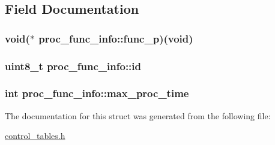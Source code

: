 \subsection{\-Field \-Documentation}
\hypertarget{structproc__func__info_ab0d228e3d6f56666fb9d9bf0f25f8d7b}{
\subsubsection[{func\-\_\-p}]{\setlength{\rightskip}{0pt plus 5cm}void($\ast$ {\bf proc\-\_\-func\-\_\-info\-::func\-\_\-p})(void)}}
\label{structproc__func__info_ab0d228e3d6f56666fb9d9bf0f25f8d7b}
\hypertarget{structproc__func__info_a133713acbe60983f171f71e2d81fae3f}{
\subsubsection[{id}]{\setlength{\rightskip}{0pt plus 5cm}uint8\-\_\-t {\bf proc\-\_\-func\-\_\-info\-::id}}}
\label{structproc__func__info_a133713acbe60983f171f71e2d81fae3f}
\hypertarget{structproc__func__info_a128ad5d7538eef603b5f0dab9c42174b}{
\subsubsection[{max\-\_\-proc\-\_\-time}]{\setlength{\rightskip}{0pt plus 5cm}int {\bf proc\-\_\-func\-\_\-info\-::max\-\_\-proc\-\_\-time}}}
\label{structproc__func__info_a128ad5d7538eef603b5f0dab9c42174b}


\-The documentation for this struct was generated from the following file\-:\begin{DoxyCompactItemize}
\item 
\hyperlink{control__tables_8h}{control\-\_\-tables.\-h}\end{DoxyCompactItemize}
